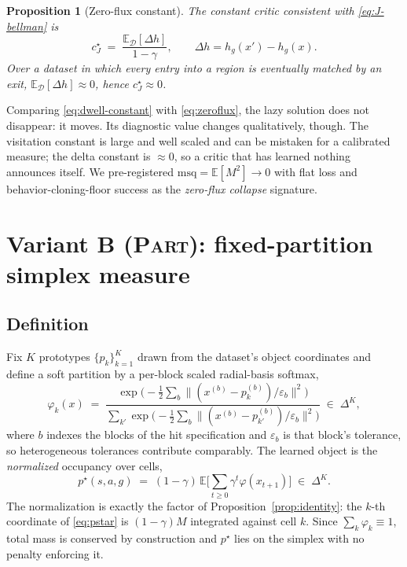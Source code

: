 \documentclass{article}
\newtheorem{proposition}{Proposition}
\providecommand{\E}{\mathbb{E}}
\newcommand{\simplex}{\Delta^{K}}
\begin{document}
\begin{proposition}[Zero-flux constant]
\label{prop:zeroflux}
The constant critic consistent with \eqref{eq:J-bellman} is
\begin{equation}
c^{\star}_{J} \;=\; \frac{\E_{\mathcal{D}}\!\left[\Delta h\right]}{1-\gamma},
\qquad \Delta h = h_g(x')-h_g(x).
\label{eq:zeroflux}
\end{equation}
Over a dataset in which every entry into a region is eventually matched by an
exit, $\E_{\mathcal{D}}[\Delta h]\approx 0$, hence $c^{\star}_{J}\approx0$.
\end{proposition}

Comparing \eqref{eq:dwell-constant} with \eqref{eq:zeroflux}, the lazy solution
does not disappear: it moves. Its diagnostic value changes qualitatively,
though. The visitation constant is large and well scaled and can be mistaken for
a calibrated measure; the delta constant is $\approx0$, so a critic that has
learned nothing announces itself. We pre-registered $\mathrm{msq}=\E[M^{2}]\to0$
with flat loss and behavior-cloning-floor success as the \emph{zero-flux
collapse} signature.

\section{Variant B (\textsc{Part}): fixed-partition simplex measure}

\subsection{Definition}

Fix $K$ prototypes $\{p_k\}_{k=1}^{K}$ drawn from the dataset's object
coordinates and define a soft partition by a per-block scaled radial-basis
softmax,
\begin{equation}
\varphi_k(x) \;=\;
\frac{\exp\!\big(-\tfrac12\sum_{b}\|(x^{(b)}-p_k^{(b)})/\varepsilon_b\|^{2}\big)}
{\sum_{k'}\exp\!\big(-\tfrac12\sum_{b}\|(x^{(b)}-p_{k'}^{(b)})/\varepsilon_b\|^{2}\big)}
\;\in\;\simplex ,
\label{eq:phi}
\end{equation}
where $b$ indexes the blocks of the hit specification and $\varepsilon_b$ is that
block's tolerance, so heterogeneous tolerances contribute comparably. The learned
object is the \emph{normalized} occupancy over cells,
\begin{equation}
p^{\star}(s,a,g) \;=\; (1-\gamma)\,\E\Big[\textstyle\sum_{t\ge0}\gamma^{t}
\varphi(x_{t+1})\Big] \;\in\;\simplex .
\label{eq:pstar}
\end{equation}
The normalization is exactly the factor of Proposition~\ref{prop:identity}: the
$k$-th coordinate of \eqref{eq:pstar} is $(1-\gamma)M$ integrated against cell
$k$. Since $\sum_k\varphi_k\equiv1$, total mass is conserved by construction and
$p^{\star}$ lies on the simplex with no penalty enforcing it.
\end{document}
